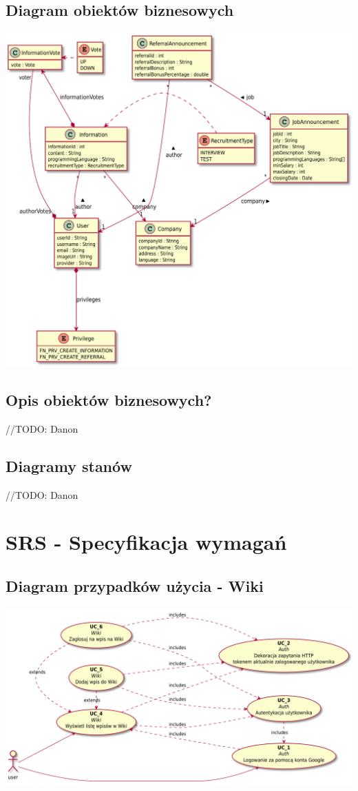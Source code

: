 \documentclass{scrreprt}
\begin{document}
\section{Diagram obiektów biznesowych}
\includegraphics[width=\textwidth, keepaspectratio]{graphics/hydra_business_class_diagram.pdf}

\section{Opis obiektów biznesowych?}
//TODO: Danon

\section{Diagramy stanów}
//TODO: Danon

\chapter{SRS - Specyfikacja wymagań}
\section{Diagram przypadków użycia - Wiki}
\includegraphics[width=\textwidth, keepaspectratio]{graphics/wiki_use_case_diagram.pdf}
\end{document}
